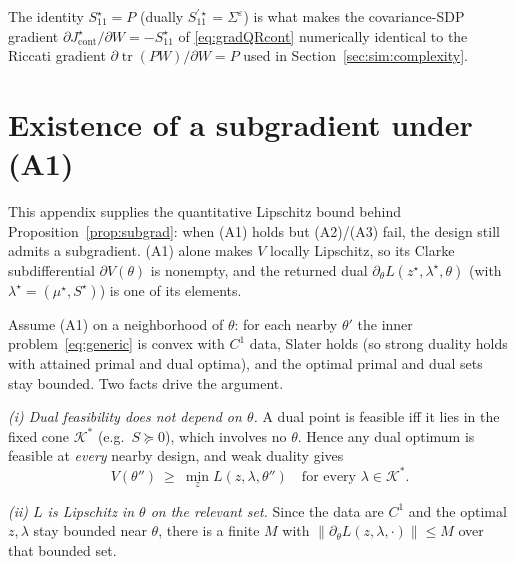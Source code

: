 \documentclass[twocolumn,amsthm]{autart}
\begin{document}
The identity $S_{11}^\star=P$ (dually $S_{11}^{\prime\star}=\Sigma^\varepsilon$) is
what makes the covariance-SDP gradient $\partial J_{\mathrm{cont}}^\star/\partial W=
-S_{11}^\star$ of \eqref{eq:gradQRcont} numerically identical to the Riccati gradient
$\partial\operatorname{tr}(PW)/\partial W=P$ used in
Section~\ref{sec:sim:complexity}.

\section{Existence of a subgradient under (A1)}\label{app:subgrad}

This appendix supplies the quantitative Lipschitz bound behind
Proposition~\ref{prop:subgrad}: when (A1) holds but (A2)/(A3) fail, the design still
admits a subgradient. (A1) alone makes
$V$ locally Lipschitz, so its Clarke subdifferential $\partial V(\theta)$ is nonempty,
and the returned dual $\partial_\theta L(z^\star,\lambda^\star,\theta)$ (with
$\lambda^\star=(\mu^\star,S^\star)$) is one of its elements.

Assume (A1) on a neighborhood of $\theta$: for each nearby $\theta'$ the inner
problem~\eqref{eq:generic} is convex with $C^1$ data, Slater holds (so strong duality
holds with attained primal and dual optima), and the optimal primal and dual sets stay
bounded. Two facts drive the argument.

\emph{(i) Dual feasibility does not depend on $\theta$.} A dual point is feasible iff it
lies in the fixed cone $\mathcal K^\ast$ (e.g.\ $S\succeq0$), which involves no $\theta$.
Hence any dual optimum is feasible at \emph{every} nearby design, and weak duality gives
\begin{equation}\label{eq:weak}
V(\theta'')\ \ge\ \min_z L(z,\lambda,\theta'')\quad\text{for every }\lambda\in\mathcal K^\ast .
\end{equation}

\emph{(ii) $L$ is Lipschitz in $\theta$ on the relevant set.} Since the data are $C^1$
and the optimal $z,\lambda$ stay bounded near $\theta$, there is a finite $M$ with
$\|\partial_\theta L(z,\lambda,\cdot)\|\le M$ over that bounded set.
\end{document}
